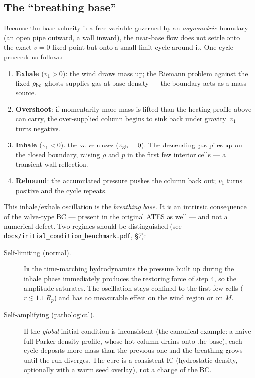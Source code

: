 \documentclass[english,a4paper]{kiseon_memo}
\begin{document}
\subsection{The ``breathing base''}
\label{sec:breathing}

Because the base velocity is a free variable governed by an
\emph{asymmetric} boundary (an open pipe outward, a wall inward), the
near-base flow does not settle onto the exact $v = 0$ fixed point but
onto a small limit cycle around it. One cycle proceeds as follows:

\begin{enumerate}
\item \textbf{Exhale} ($v_1 > 0$): the wind draws mass up; the
  Riemann problem against the fixed-$\rho_{\rm bc}$ ghosts supplies
  gas at base density --- the boundary acts as a mass source.
\item \textbf{Overshoot}: if momentarily more mass is lifted than the
  heating profile above can carry, the over-supplied column begins to
  sink back under gravity; $v_1$ turns negative.
\item \textbf{Inhale} ($v_1 < 0$): the valve closes
  ($v_{\rm gh} = 0$). The descending gas piles up on the closed
  boundary, raising $\rho$ and $p$ in the first few interior cells ---
  a transient wall reflection.
\item \textbf{Rebound}: the accumulated pressure pushes the column
  back out; $v_1$ turns positive and the cycle repeats.
\end{enumerate}

This inhale/exhale oscillation is the \emph{breathing base}. It is an
intrinsic consequence of the valve-type BC --- present in the original
ATES as well --- and not a numerical defect. Two regimes should be
distinguished (see \texttt{docs/initial\_condition\_benchmark.pdf},
\S7):

\begin{description}
\item[Self-limiting (normal).] In the time-marching hydrodynamics the
  pressure built up during the inhale phase immediately produces the
  restoring force of step 4, so the amplitude saturates. The
  oscillation stays confined to the first few cells
  ($r \lesssim 1.1\,R_p$) and has no measurable effect on the wind
  region or on $\dot M$.
\item[Self-amplifying (pathological).] If the \emph{global} initial
  condition is inconsistent (the canonical example: a naive full-Parker
  density profile, whose hot column drains onto the base), each cycle
  deposits more mass than the previous one and the breathing grows
  until the run diverges. The cure is a consistent IC (hydrostatic
  density, optionally with a warm seed overlay), not a change of the
  BC.
\end{description}
\end{document}
